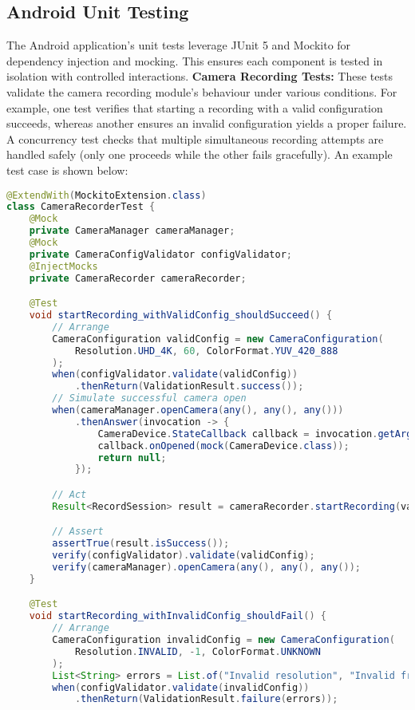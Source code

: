 \documentclass[11pt,a4paper]{report}
\begin{document}
\subsection{Android Unit Testing}
The Android application’s unit tests leverage JUnit 5 and Mockito for dependency injection and mocking. This ensures each component is tested in isolation with controlled interactions.
\textbf{Camera Recording Tests:} These tests validate the camera recording module’s behaviour under various conditions. For example, one test verifies that starting a recording with a valid configuration succeeds, whereas another ensures an invalid configuration yields a proper failure. A concurrency test checks that multiple simultaneous recording attempts are handled safely (only one proceeds while the other fails gracefully). An example test case is shown below:
\begin{lstlisting}[language=Java]
@ExtendWith(MockitoExtension.class)
class CameraRecorderTest {
    @Mock
    private CameraManager cameraManager;
    @Mock
    private CameraConfigValidator configValidator;
    @InjectMocks
    private CameraRecorder cameraRecorder;

    @Test
    void startRecording_withValidConfig_shouldSucceed() {  
        // Arrange  
        CameraConfiguration validConfig = new CameraConfiguration(  
            Resolution.UHD_4K, 60, ColorFormat.YUV_420_888  
        );  
        when(configValidator.validate(validConfig))  
            .thenReturn(ValidationResult.success());  
        // Simulate successful camera open  
        when(cameraManager.openCamera(any(), any(), any()))  
            .thenAnswer(invocation -> {  
                CameraDevice.StateCallback callback = invocation.getArgument(1);  
                callback.onOpened(mock(CameraDevice.class));  
                return null;  
            });  

        // Act  
        Result<RecordSession> result = cameraRecorder.startRecording(validConfig);  

        // Assert  
        assertTrue(result.isSuccess());  
        verify(configValidator).validate(validConfig);  
        verify(cameraManager).openCamera(any(), any(), any());  
    }

    @Test
    void startRecording_withInvalidConfig_shouldFail() {  
        // Arrange  
        CameraConfiguration invalidConfig = new CameraConfiguration(  
            Resolution.INVALID, -1, ColorFormat.UNKNOWN  
        );  
        List<String> errors = List.of("Invalid resolution", "Invalid frame rate");  
        when(configValidator.validate(invalidConfig))  
            .thenReturn(ValidationResult.failure(errors));  


\end{lstlisting}
\end{document}
